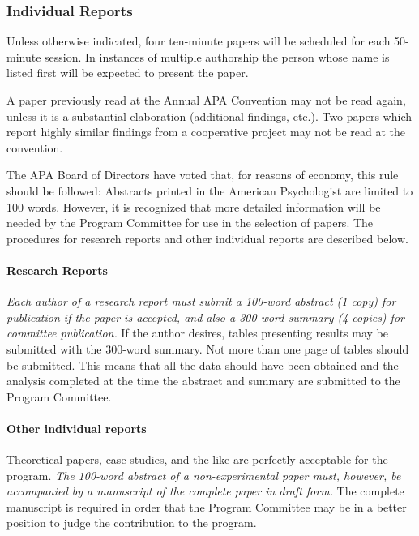 {{\subsubsection{Individual Reports}
\label{individualreports}

Unless otherwise indicated, four ten-minute papers will be scheduled for each 50-minute session. In instances of multiple authorship the person whose name is listed first will be expected to present the paper.

A paper previously read at the Annual APA Convention may not be read again, unless it is a substantial elaboration (additional findings, etc.). Two papers which report highly similar findings from a cooperative project may not be read at the convention.

The APA Board of Directors have voted that, for reasons of economy, this rule should be followed: Abstracts printed in the American Psychologist are limited to 100 words. However, it is recognized that more detailed information will be needed by the Program Committee for use in the selection of papers. The procedures for research reports and other individual reports are described below.

\paragraph{Research Reports}
\label{researchreports}

\emph{Each author of a research report must submit a 100-word abstract (1 copy) for publication if the paper is accepted, and also a 300-word summary (4 copies) for committee publication.} If the author desires, tables presenting results may be submitted with the 300-word summary. Not more than one page of tables should be submitted. This means that all the data should have been obtained and the analysis completed at the time the abstract and summary are submitted to the Program Committee.

\paragraph{Other individual reports}
\label{otherindividualreports}

Theoretical papers, case studies, and the like are perfectly acceptable for the program. \emph{The 100-word abstract of a non-experimental paper must, however, be accompanied by a manuscript of the complete paper in draft form.} The complete manuscript is required in order that the Program Committee may be in a better position to judge the contribution to the program.

}}

